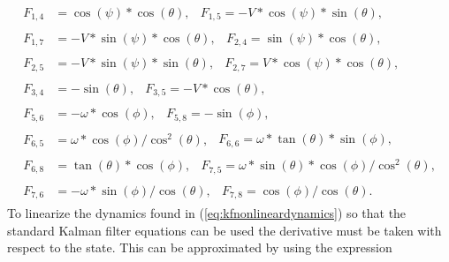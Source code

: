 \begin{align*}
\begin{split}
F_{1,4} &= \cos(\psi)*\cos(\theta),
\end{split}
\begin{split}
F_{1,5} = -V*\cos(\psi)*\sin(\theta),
\end{split} \\
\begin{split}
F_{1,7} &= -V*\sin(\psi)*\cos(\theta),
\end{split}
\begin{split}
F_{2,4} = \sin(\psi)*\cos(\theta),
\end{split} \\
\begin{split}
F_{2,5} &= -V*\sin(\psi)*\sin(\theta),
\end{split}
\begin{split}
F_{2,7} = V*\cos(\psi)*\cos(\theta),
\end{split} \\
\begin{split}
F_{3,4} &= -\sin(\theta),
\end{split}
\begin{split}
F_{3,5} = -V*\cos(\theta),
\end{split} \\
\begin{split}
F_{5,6} &= -\omega *\cos(\phi),
\end{split}
\begin{split}
F_{5,8} = -\sin(\phi),
\end{split} \\
\begin{split}
F_{6,5} &= \omega *\cos(\phi)/\cos^2(\theta),
\end{split}
\begin{split}
F_{6,6} = \omega *\tan(\theta)*\sin(\phi),
\end{split} \\
\begin{split}
F_{6,8} &= \tan(\theta)*\cos(\phi),
\end{split}
\begin{split}
F_{7,5} = \omega *\sin(\theta)*\cos(\phi)/\cos^2(\theta),
\end{split} \\
\begin{split}
F_{7,6} &= -\omega *\sin(\phi)/\cos(\theta),
\end{split}
\begin{split}
F_{7,8} = \cos(\phi)/\cos(\theta).
\end{split}
\end{align*}
To linearize the dynamics found in (\ref{eq:kfnonlineardynamics}) so that the standard Kalman filter equations can be used the derivative must be taken with respect to the state. This can be approximated by using the expression

